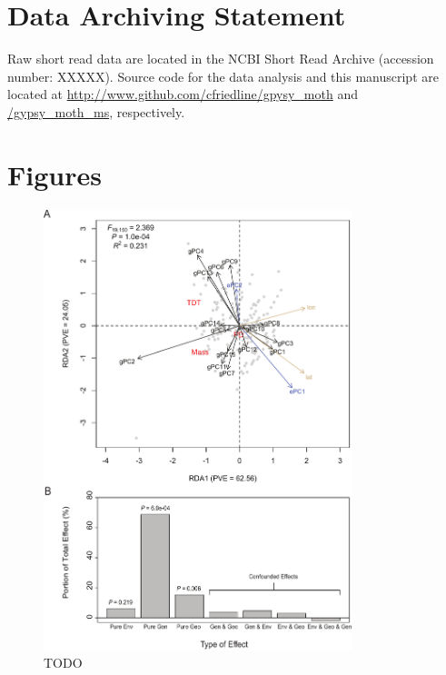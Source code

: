 \documentclass[smallextended]{svjour3}
\begin{document}
\section*{Data Archiving Statement}

Raw short read data are located in the NCBI Short Read Archive (accession
number: XXXXX). Source code for the data analysis and this manuscript are
located at
\url{http://www.github.com/cfriedline/gpysy_moth} and \url{/gypsy_moth_ms},
respectively.


\clearpage



\clearpage


\section*{Figures}
\begin{figure}[ht]
\centering
\includegraphics[width=0.8\textwidth]{rda_fig-crop}
\caption{TODO}
\label{fig:rda}
\end{figure}

\clearpage
\end{document}
